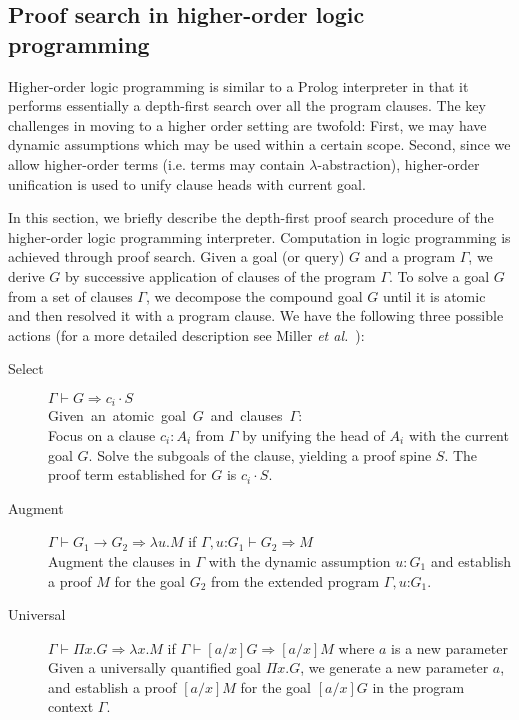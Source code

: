 \documentclass{llncs}
\newcommand{\vd}{\vdash}
\newcommand{\arrow}{\rightarrow}
\newcommand{\oftp}{\mathord{:}}
\begin{document}
\subsection{Proof search in higher-order logic programming}

Higher-order logic programming is similar to a Prolog interpreter in
that it performs essentially a depth-first search over all the program
clauses. The key challenges in moving to a higher order setting are
twofold: First, we may have dynamic assumptions which may be
used within a certain scope. Second, since we allow higher-order
terms (i.e. terms may contain $\lambda$-abstraction), higher-order
unification is used to unify clause heads with current goal. 

In this section,  we briefly describe the depth-first proof search
procedure of the higher-order logic programming
interpreter. Computation in logic programming is achieved through
proof search. Given a goal (or query) $G$ and a program $\Gamma$, we
derive $G$ by successive application of clauses of the program
$\Gamma$. 
To solve a goal $G$ from a set of clauses $\Gamma$, we decompose the
compound goal $G$ until it is atomic and then resolved it with a
program clause. We have the following three possible actions (for a
more detailed description see Miller {\em{et al.}}~\cite{Miller91apal}):

\begin{small}
\begin{description}
\item[Select] $\Gamma \vd  G \Rightarrow c_i \cdot S$ \\
    \mbox{Given an atomic goal $G$ and clauses $\Gamma$:}\hfill\\
     Focus on a clause $c_i : A_i$ from $\Gamma$ by unifying the 
     head of $A_i$ with the current goal $G$. 
     Solve the subgoals of the clause, yielding a proof spine $S$.
     The proof term established for $G$ is $c_i\cdot S$.

\item[Augment] $\Gamma \vd  G_1 \arrow G_2 \Rightarrow \lambda u. M$ if $\Gamma,
  u\oftp G_1 \vd G_2 \Rightarrow M$ \\
Augment the clauses in $\Gamma$ with the dynamic assumption $u{:} G_1$ and
establish a proof $M$ for the goal $G_2$ from the extended program
$\Gamma, u \oftp G_1$. 
\item[Universal] $\Gamma \vd  \Pi x. G \Rightarrow \lambda x. M$ if $\Gamma \vd
  [a/x]G\Rightarrow [a/x]M$ where $a$ is a new parameter\\
Given a universally quantified goal $\Pi x. G$, we generate a new parameter $a$, and establish a proof $[a/x]M$ for the goal $[a/x]G$ in the program context $\Gamma$.
\end{description}
\end{small}    
\end{document}
